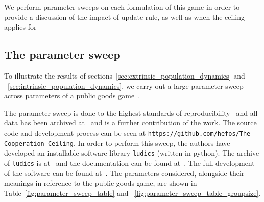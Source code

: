 \documentclass{article}
\begin{document}
We perform parameter sweeps on each formulation of this game in order to provide
a discussion of the impact of update rule, as well as when the ceiling applies for 

\subsection{The parameter sweep}
To illustrate the results of sections~\ref{sec:extrinsic_population_dynamics}
and ~\ref{sec:intrinsic_population_dynamics}, we carry out a large parameter
sweep across parameters of a public goods game~\cite{ARCHETTI20129,
hauert2002volunteering, HauertDynamics2004, hauser2019social,
calc_of_selfishness}. 

The parameter sweep is done to the highest standards of
reproducibility~\cite{wilson2017, stodden2016, turingway2022, Wilson2014,
sandve2013} and all data has been archived at~\cite{data_archive} and is a
further contribution of the work. The source code and development process can be
seen at \texttt{https://github.com/hefos/The-Cooperation-Ceiling}. In order to
perform this sweep, the authors have developed an installable software library
\texttt{ludics} (written in python). The archive of \texttt{ludics} is
at~\cite{ludics_archive} and the documentation can be found %
at~\cite{ludics_docs}. The full development of the software can be found
at~\cite{ludics}. The parameters considered, alongside their meanings in
reference to the public goods game, are shown in
Table~\ref{fig:parameter_sweep_table} and
~\ref{fig:parameter_sweep_table_groupsize}.
\end{document}
